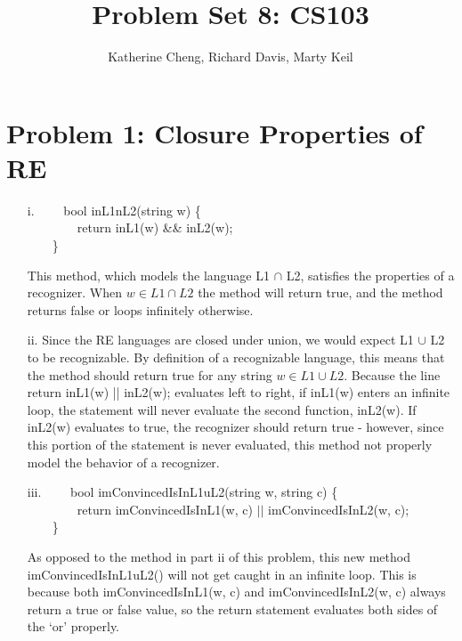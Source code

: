\documentclass[10pt,letter]{article}
\begin{document}

\title{Problem Set 8: CS103}

\author{Katherine Cheng, Richard Davis, Marty Keil}

 
\maketitle

\section*{Problem 1: Closure Properties of RE}

\begin{enumerate}
\item[i.] 
{\selectfont
$\qquad$bool inL1nL2(string w) \{\\
$\qquad$$\qquad$return inL1(w) \&\& inL2(w);\\
$\qquad$\}
}

This method, which models the language L1 $\cap$ L2, satisfies the properties of a recognizer. When $w \in L1 \cap L2$ the method will return true, and the method returns false or loops infinitely otherwise.
\item[ii.] Since the RE languages are closed under union, we would expect L1 $\cup$ L2 to be recognizable. By definition of a recognizable language, this means that the method should return true for any string $w \in L1 \cup L2$. Because the line {\selectfont return inL1(w) || inL2(w);} evaluates left to right, if {\selectfont inL1(w)} enters an infinite loop, the statement will never evaluate the second function, {\selectfont inL2(w)}. If {\selectfont inL2(w)} evaluates to true, the recognizer should return true - however, since this portion of the statement is never evaluated, this method not properly model the behavior of a recognizer.
\item[iii.] 
{\selectfont
$\qquad$bool imConvincedIsInL1uL2(string w, string c) \{\\
$\qquad$$\qquad$return imConvincedIsInL1(w, c) $||$  imConvincedIsInL2(w, c);\\
$\qquad$\}
}

As opposed to the method in part ii of this problem, this new method {\selectfont imConvincedIsInL1uL2()} will not get caught in an infinite loop. This is because both {\selectfont imConvincedIsInL1(w, c)} and {\selectfont imConvincedIsInL2(w, c)} always return a true or false value, so the return statement evaluates both sides of the `or' properly.
\end{enumerate}
\end{document}
